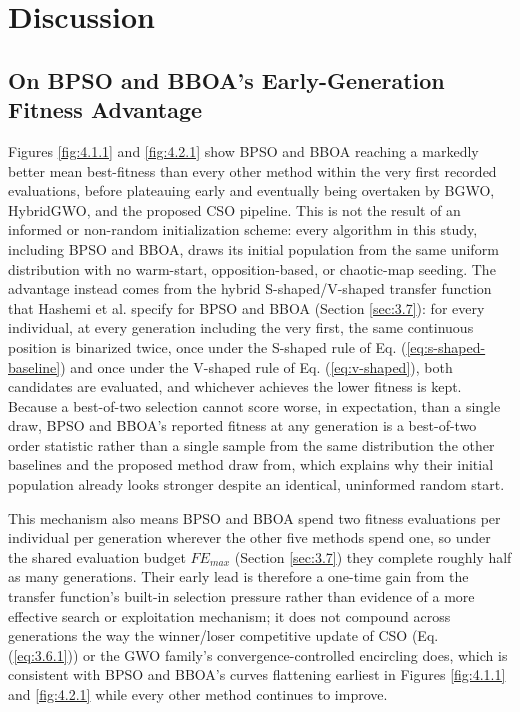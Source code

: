 \section{Discussion} \label{sec:5}

\subsection{On BPSO and BBOA's Early-Generation Fitness Advantage} \label{sec:5.1}
Figures \ref{fig:4.1.1} and \ref{fig:4.2.1} show BPSO and BBOA reaching a markedly better mean best-fitness than every other method within the very first recorded evaluations, before plateauing early and eventually being overtaken by BGWO, HybridGWO, and the proposed CSO pipeline. This is not the result of an informed or non-random initialization scheme: every algorithm in this study, including BPSO and BBOA, draws its initial population from the same uniform distribution with no warm-start, opposition-based, or chaotic-map seeding. The advantage instead comes from the hybrid S-shaped/V-shaped transfer function that Hashemi et al. \cite{Hashemi:2026} specify for BPSO and BBOA (Section \ref{sec:3.7}): for every individual, at every generation including the very first, the same continuous position is binarized twice, once under the S-shaped rule of Eq. (\ref{eq:s-shaped-baseline}) and once under the V-shaped rule of Eq. (\ref{eq:v-shaped}), both candidates are evaluated, and whichever achieves the lower fitness is kept. Because a best-of-two selection cannot score worse, in expectation, than a single draw, BPSO and BBOA's reported fitness at any generation is a best-of-two order statistic rather than a single sample from the same distribution the other baselines and the proposed method draw from, which explains why their initial population already looks stronger despite an identical, uninformed random start.

This mechanism also means BPSO and BBOA spend two fitness evaluations per individual per generation wherever the other five methods spend one, so under the shared evaluation budget $FE_{max}$ (Section \ref{sec:3.7}) they complete roughly half as many generations. Their early lead is therefore a one-time gain from the transfer function's built-in selection pressure rather than evidence of a more effective search or exploitation mechanism; it does not compound across generations the way the winner/loser competitive update of CSO (Eq. (\ref{eq:3.6.1})) or the GWO family's convergence-controlled encircling does, which is consistent with BPSO and BBOA's curves flattening earliest in Figures \ref{fig:4.1.1} and \ref{fig:4.2.1} while every other method continues to improve.

